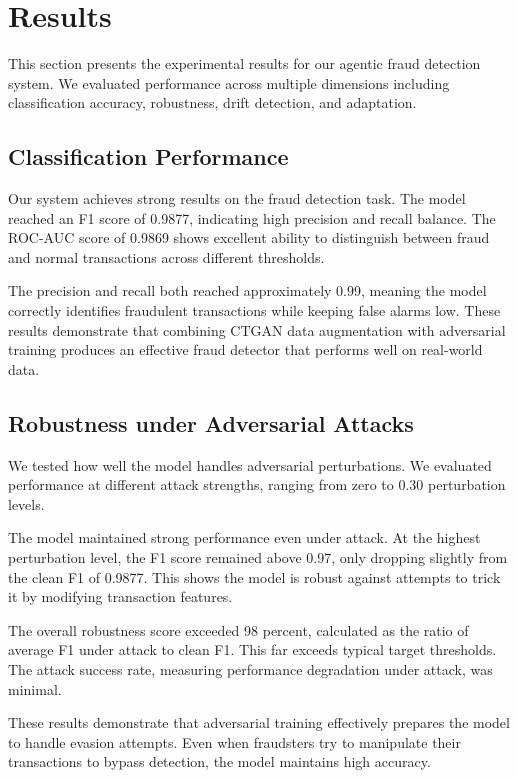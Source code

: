 \section{Results}\label{sec:results}

This section presents the experimental results for our agentic fraud detection system. We evaluated performance across multiple dimensions including classification accuracy, robustness, drift detection, and adaptation.

\subsection{Classification Performance}

Our system achieves strong results on the fraud detection task. The model reached an F1 score of 0.9877, indicating high precision and recall balance. The ROC-AUC score of 0.9869 shows excellent ability to distinguish between fraud and normal transactions across different thresholds.

The precision and recall both reached approximately 0.99, meaning the model correctly identifies fraudulent transactions while keeping false alarms low. These results demonstrate that combining CTGAN data augmentation with adversarial training produces an effective fraud detector that performs well on real-world data.

\subsection{Robustness under Adversarial Attacks}

We tested how well the model handles adversarial perturbations. We evaluated performance at different attack strengths, ranging from zero to 0.30 perturbation levels.

The model maintained strong performance even under attack. At the highest perturbation level, the F1 score remained above 0.97, only dropping slightly from the clean F1 of 0.9877. This shows the model is robust against attempts to trick it by modifying transaction features.

The overall robustness score exceeded 98 percent, calculated as the ratio of average F1 under attack to clean F1. This far exceeds typical target thresholds. The attack success rate, measuring performance degradation under attack, was minimal.

These results demonstrate that adversarial training effectively prepares the model to handle evasion attempts. Even when fraudsters try to manipulate their transactions to bypass detection, the model maintains high accuracy.

